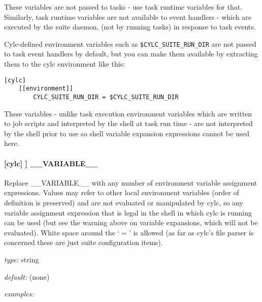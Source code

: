 \begin{myitemize}
    \item These variables are not passed to tasks - use task runtime
        variables for that. Similarly, task runtime variables are not
        available to event handlers - which are executed by the suite daemon,
        (not by running tasks) in response to task events.
        
    \item Cylc-defined environment variables such as
        \lstinline=$CYLC_SUITE_RUN_DIR= are not passed to task event
        handlers by default, but you can make them available by
        extracting them to the cylc environment like this:
\begin{lstlisting}
[cylc]
    [[environment]]
        CYLC_SUITE_RUN_DIR = $CYLC_SUITE_RUN_DIR
\end{lstlisting}

    \item These variables - unlike task execution environment variables
        which are written to job scripts and interpreted by the shell at
        task run time - are not interpreted by the shell prior to use
        so shell variable expansion expressions cannot be used here.
\end{myitemize}

\paragraph[\_\_VARIABLE\_\_ ]{[cylc] \textrightarrow [[environment]] \textrightarrow \_\_VARIABLE\_\_}

Replace \_\_VARIABLE\_\_ with any number of environment variable
assignment expressions.
Values may refer to other local environment variables (order of
definition is preserved) and are not evaluated or manipulated by
cylc, so any variable assignment expression that is legal in the
shell in which cylc is running can be used (but see the warning
above on variable expansions, which will not be evaluated).
White space around the `$=$' is allowed (as far as cylc's file 
parser is concerned these are just suite configuration items).

\begin{myitemize}
    \item {\em type:} string
    \item {\em default:} (none)
    \item {\em examples:}
\end{myitemize}


